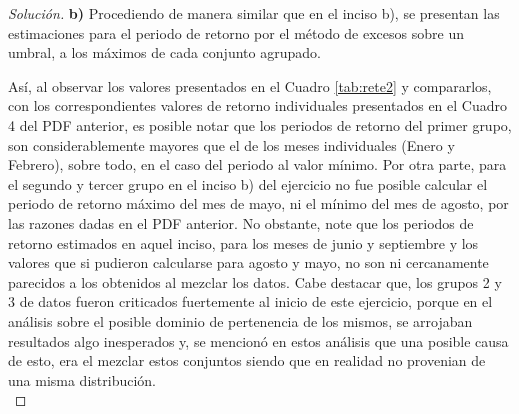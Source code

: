 \documentclass[10.5pt,notitlepage]{article}
\newenvironment{solucion}
  {\begin{proof}[Solución]}
  {\end{proof}}
\theoremstyle{plain}
\begin{document}
\begin{solucion}
\textbf{b)} Procediendo de manera similar que en el inciso b), se presentan las estimaciones para el periodo de retorno por el método de excesos sobre un umbral, a los máximos de cada conjunto agrupado. 
\begin{table}[H]
        \centering
        \caption{Periodos de retorno de temperaturas máximas en Albania por grupo.}
        \label{tab:rete2}
\end{table}	
Así, al observar los valores presentados en el Cuadro \ref{tab:rete2} y compararlos, con los correspondientes valores de retorno individuales presentados en el Cuadro 4 del PDF anterior, 
es posible notar que los periodos de retorno del primer grupo, son considerablemente mayores que el de los meses individuales (Enero y Febrero), sobre todo, en el caso del periodo al valor mínimo. Por otra parte, para el segundo y tercer grupo en el inciso b) del ejercicio no fue posible calcular el periodo de retorno máximo del mes de mayo, ni el mínimo del mes de agosto, por las razones dadas en el PDF anterior. No obstante, note que los periodos de retorno estimados en aquel inciso, para los meses de junio y septiembre y los valores que si pudieron calcularse para agosto y mayo, no son ni cercanamente parecidos a los obtenidos al mezclar los datos. Cabe destacar que, los grupos 2 y 3 de datos  fueron criticados fuertemente al inicio de este ejercicio, porque en el análisis sobre el posible dominio de pertenencia de los mismos, se arrojaban resultados algo inesperados y, se mencionó en estos análisis que una posible causa de esto, era el mezclar estos conjuntos siendo que en realidad no provenian de una misma distribución.\\


\end{solucion}
\end{document}
